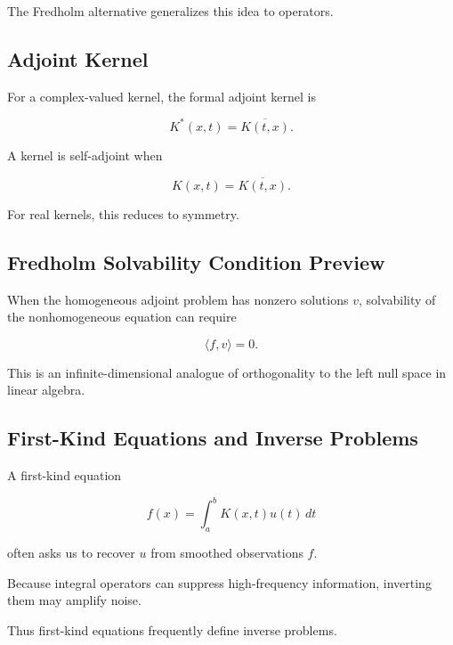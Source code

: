 The Fredholm alternative generalizes this idea to operators.

\subsection{Adjoint Kernel}
\label{subsec:adjoint-kernel-preview}

For a complex-valued kernel, the formal adjoint kernel is

\[
\boxed{
K^*(x,t)
=
\overline{K(t,x)}.
}
\]

A kernel is self-adjoint when

\[
\boxed{
K(x,t)
=
\overline{K(t,x)}.
}
\]

For real kernels, this reduces to symmetry.

\subsection{Fredholm Solvability Condition Preview}
\label{subsec:fredholm-solvability-condition-preview}

When the homogeneous adjoint problem has nonzero solutions \(v\),
solvability of the nonhomogeneous equation can require

\[
\boxed{
\langle f,v\rangle=0.
}
\]

This is an infinite-dimensional analogue of orthogonality to the left
null space in linear algebra.

\subsection{First-Kind Equations and Inverse Problems}
\label{subsec:first-kind-inverse-problems}

A first-kind equation

\[
\boxed{
f(x)
=
\int_a^b
K(x,t)u(t)\,dt
}
\]

often asks us to recover \(u\) from smoothed observations \(f\).

Because integral operators can suppress high-frequency information,
inverting them may amplify noise.

Thus first-kind equations frequently define inverse problems.

